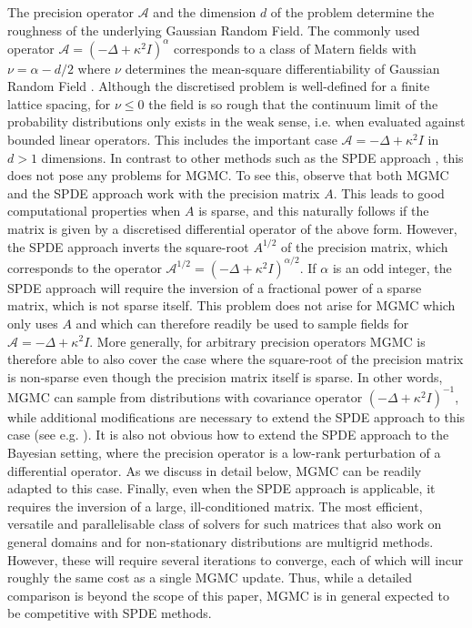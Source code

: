 \documentclass[11pt,english]{article}
\theoremstyle{plain}
\theoremstyle{plain}
\theoremstyle{plain}
\theoremstyle{plain}
\numberwithin{equation}{section}
\newcommand*{\id}{I}
\newcommand{\rev}[1]{#1}
\begin{document}
The precision operator $\mathcal{A}$ and the dimension $d$ of the problem determine the roughness of the underlying Gaussian Random Field. The commonly used operator $\mathcal{A}=(-\Delta+\kappa^2\id)^\alpha$ corresponds to a class of Matern fields with $\nu=\alpha - d/2$ where $\nu$ determines the mean-square differentiability of Gaussian Random Field \cite{LindgrenEtAl.F_2011_ExplicitLinkGaussian}. Although the discretised problem is well-defined for a finite lattice spacing, for $\nu\le 0$ the field is so rough that the continuum limit of the probability distributions only exists in the weak sense, i.e. when evaluated against bounded linear operators. This includes the important case $\mathcal{A}=-\Delta+\kappa^2\id$ in $d>1$ dimensions. In contrast to other methods such as the SPDE approach \cite{LindgrenEtAl.F_2011_ExplicitLinkGaussian,LindgrenEtAl.F_2022_SPDEApproachGaussian,Croci.M_etal_2018_EfficientWhiteNoise}, this does not pose any problems for MGMC. To see this, observe that both MGMC and the SPDE approach work with the precision matrix $A$. This leads to good computational properties when $A$ is sparse, and this naturally follows if the matrix is given by a discretised differential operator of the above form. However, the SPDE approach inverts the square-root $A^{1/2}$ of the precision matrix, which corresponds to the operator $\mathcal{A}^{1/2}=(-\Delta+\kappa^2\id)^{\alpha/2}$. If $\alpha$ is an odd integer, the SPDE approach will require the inversion of a fractional power of a sparse matrix, which is not sparse itself. This problem does not arise for MGMC which only uses $A$ and which can therefore readily be used to sample fields for $\mathcal{A}=-\Delta+\kappa^2\id$. More generally, for arbitrary precision operators MGMC is therefore able to also cover the case where the square-root of the precision matrix is non-sparse even though the precision matrix itself is sparse. \rev{In other words, MGMC can sample from distributions with covariance operator $(-\Delta+\kappa^2 I)^{-1}$, while additional modifications are necessary to extend the SPDE approach to this case  (see e.g. \cite{bolin2018weak}). 
It is also not obvious how to extend the SPDE approach to the Bayesian setting, where the precision operator is a low-rank perturbation of a differential operator. As we discuss in detail below, MGMC can be readily adapted to this case. Finally, even when the SPDE approach is applicable, it requires the inversion of a large, ill-conditioned matrix. The most efficient, versatile and parallelisable class of solvers for such matrices that also work on general domains and for non-stationary distributions are multigrid methods. However, these will require several iterations to converge, each of which will incur roughly the same cost as a single MGMC update. Thus, while a detailed comparison is beyond the scope of this paper, MGMC is in general expected to be competitive with SPDE methods.}
\end{document}
